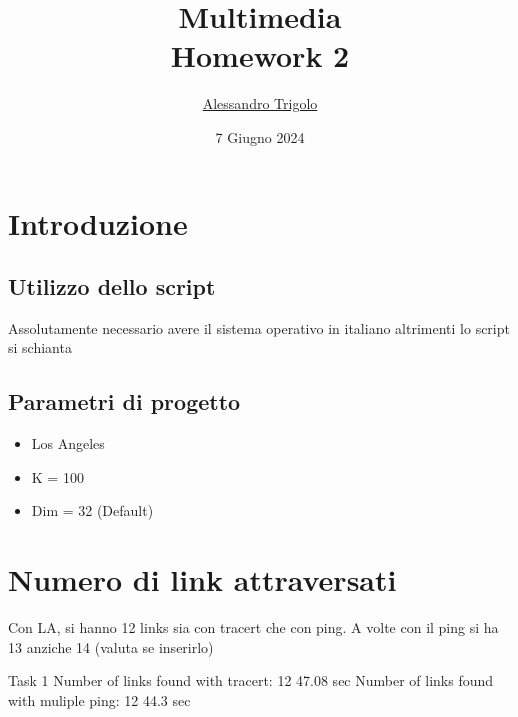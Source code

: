 \title{\vspace{160px} \textbf{\huge{Multimedia}} \\\vspace{17.5px} \LARGE{Homework 2}  \vspace{10px}}
\author{\href{https://github.com/imAlessas}{Alessandro Trigolo}}
\date{7 Giugno 2024}



\maketitle\newpage

\tableofcontents
\vspace{50px}
\listoffigures
\newpage

\section{Introduzione}

\vspace{15px}\subsection{Utilizzo dello script}
Assolutamente necessario avere il sistema operativo in italiano altrimenti lo script si schianta

\vspace{15px}\subsection{Parametri di progetto}

\begin{itemize}
    \item Los Angeles
    \item K = 100
    \item Dim = 32 (Default)
\end{itemize}

\vspace{35px}\section{Numero di link attraversati}

Con LA, si hanno 12 links sia con tracert che con ping. A volte con il ping si ha 13 anziche 14 (valuta se inserirlo)

Task 1
 Number of links found with tracert: 12
                47.08 sec
 Number of links found with muliple ping: 12
                44.3 sec

